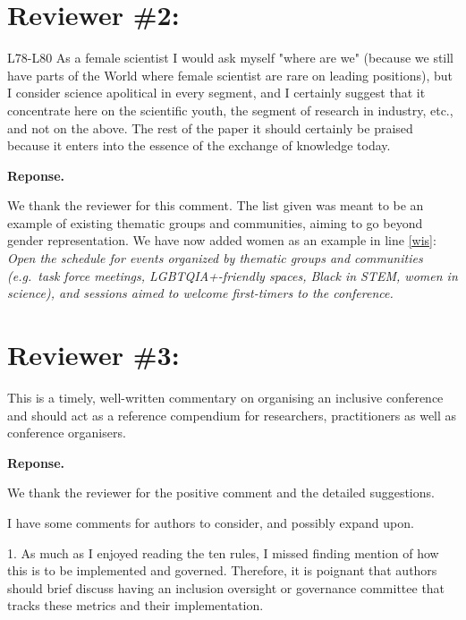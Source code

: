 \documentclass{article}
\newenvironment{Reply}{\noindent\color{BlueViolet}\textbf{Reponse.}}{\vspace{1em}}
\begin{document}
\section*{Reviewer \#2:}
L78-L80 As a female scientist I would ask myself "where are we" (because we still have parts of the World where female scientist are rare on leading positions), but I consider science apolitical in every segment, and I certainly suggest that it concentrate here on the scientific youth, the segment of research in industry, etc., and not on the above.
The rest of the paper it should certainly be praised because it enters into the essence of the exchange of knowledge today.

\begin{Reply}

    We thank the reviewer for this comment. The list given was meant to be an example of existing thematic groups and communities, aiming to go beyond gender representation.
    We have now added women as an example in line \ref{wis}:
    \textit{Open the schedule for events organized by thematic groups and communities (e.g.\ task force meetings, LGBTQIA+-friendly spaces, Black in STEM, women in science), and sessions aimed to welcome first-timers to the conference.}
\end{Reply}

\section*{Reviewer \#3:} 
This is a timely, well-written commentary on organising an inclusive conference and should act as a reference compendium for researchers, practitioners as well as conference organisers.

\begin{Reply}

    We thank the reviewer for the positive comment and the detailed suggestions.
\end{Reply}

I have some comments for authors to consider, and possibly expand upon.

1. As much as I enjoyed reading the ten rules, I missed finding mention of how this is to be implemented and governed. Therefore, it is poignant that authors should brief discuss having an inclusion oversight or governance committee that tracks these metrics and their implementation.
\end{document}
